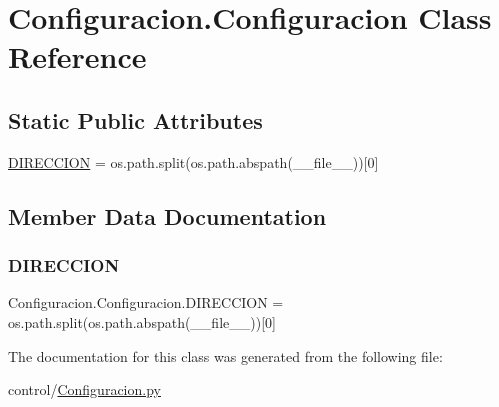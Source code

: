 \hypertarget{class_configuracion_1_1_configuracion}{}\section{Configuracion.\+Configuracion Class Reference}
\label{class_configuracion_1_1_configuracion}
\subsection*{Static Public Attributes}
\begin{DoxyCompactItemize}
\item 
\mbox{\hyperlink{class_configuracion_1_1_configuracion_a8aed3273377e5707e9a22f395d5562e9}{D\+I\+R\+E\+C\+C\+I\+ON}} = os.\+path.\+split(os.\+path.\+abspath(\+\_\+\+\_\+file\+\_\+\+\_\+))\mbox{[}0\mbox{]}
\end{DoxyCompactItemize}


\subsection{Member Data Documentation}
\mbox{\label{class_configuracion_1_1_configuracion_a8aed3273377e5707e9a22f395d5562e9}} 
\subsubsection{\texorpdfstring{D\+I\+R\+E\+C\+C\+I\+ON}{DIRECCION}}
{\footnotesize\ttfamily Configuracion.\+Configuracion.\+D\+I\+R\+E\+C\+C\+I\+ON = os.\+path.\+split(os.\+path.\+abspath(\+\_\+\+\_\+file\+\_\+\+\_\+))\mbox{[}0\mbox{]}\hspace{0.3cm}{\ttfamily [static]}}



The documentation for this class was generated from the following file\+:\begin{DoxyCompactItemize}
\item 
control/\mbox{\hyperlink{_configuracion_8py}{Configuracion.\+py}}\end{DoxyCompactItemize}
